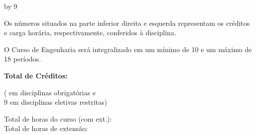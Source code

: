 \documentclass[a4paper, landscape]{article}
\newcounter{cred}
\newcounter{thoras}
\begin{document}
\setcounter{haula}{\the\value{thoras}}
\setcounter{hextensao}{\the\value{thoras}}
\divide\value{hextensao} by 9
\addtocounter{thoras}{\the\value{hextensao}}
\addtocounter{hextensao}{1} %

\vspace{-4mm}
\setlength\parindent{0pt}

\begin{multicols}{4}
  \vfill
  Os números situados na parte inferior direita e esquerda representam os créditos e carga horária, respectivamente, conferidos à disciplina.

  
  \columnbreak
  O Curso de Engenharia será integralizado em um mínimo de 10 e um máximo de 18 períodos.

  \columnbreak
  \textbf{Total de Créditos:} \the\value{cred}\\
  \addtocounter{cred}{-9}
  (\the\value{cred} em disciplinas obrigatórias e\\ 9 em disciplinas eletivas restritas)

  \columnbreak
  Total de horas do curso (com ext.): \the\value{haula}\\
  Total de horas de extensão: \the\value{hextensao}

  
\end{multicols}
\end{document}
